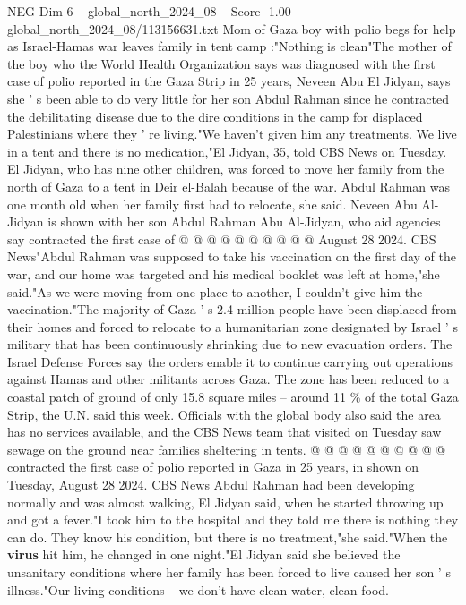 \begin{textsample}{NEG Dim 6 – global\_north\_2024\_08 – Score -1.00 – global\_north\_2024\_08/113156631.txt}  \label{ex:f6_neg_164}
Mom of Gaza boy with polio begs for help as Israel-Hamas war leaves family in tent camp :"Nothing is clean"The mother of the boy who the World Health Organization says was diagnosed with the first case of polio reported in the Gaza Strip in 25 years, Neveen Abu El Jidyan, says she ' s been able to do very little for her son Abdul Rahman since he contracted the debilitating disease due to the dire conditions in the camp for displaced Palestinians where they ' re living."We haven't given him any treatments.
We live in a tent and there is no medication,"El Jidyan, 35, told CBS News on Tuesday.
El Jidyan, who has nine other children, was forced to move her family from the north of Gaza to a tent in Deir el-Balah because of the war.
Abdul Rahman was one month old when her family first had to relocate, she said.
Neveen Abu Al-Jidyan is shown with her son Abdul Rahman Abu Al-Jidyan, who aid agencies say contracted the first case of @ @ @ @ @ @ @ @ @ @ August 28 2024.
CBS News"Abdul Rahman was supposed to take his vaccination on the first day of the war, and our home was targeted and his medical booklet was left at home,"she said."As we were moving from one place to another, I couldn't give him the vaccination."The majority of Gaza ' s 2.4 million people have been displaced from their homes and forced to relocate to a humanitarian zone designated by Israel ' s military that has been continuously shrinking due to new evacuation orders.
The Israel Defense Forces say the orders enable it to continue carrying out operations against Hamas and other militants across Gaza.
The zone has been reduced to a coastal patch of ground of only 15.8 square miles -- around 11 \% of the total Gaza Strip, the U.N. said this week.
Officials with the global body also said the area has no services available, and the CBS News team that visited on Tuesday saw sewage on the ground near families sheltering in tents. @ @ @ @ @ @ @ @ @ @ contracted the first case of polio reported in Gaza in 25 years, in shown on Tuesday, August 28 2024.
CBS News Abdul Rahman had been developing normally and was almost walking, El Jidyan said, when he started throwing up and got a fever."I took him to the hospital and they told me there is nothing they can do.
They know his condition, but there is no treatment,"she said."When the \textbf{virus} hit him, he changed in one night."El Jidyan said she believed the unsanitary conditions where her family has been forced to live caused her son ' s illness."Our living conditions -- we don't have clean water, clean food.

\end{textsample}
